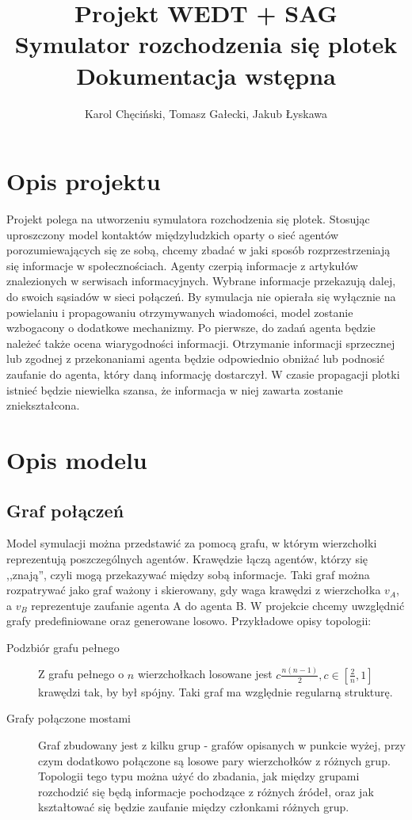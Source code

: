 \documentclass{article}
\title{Projekt WEDT + SAG \\ Symulator rozchodzenia się plotek \\ Dokumentacja wstępna}
\author{Karol Chęciński, Tomasz Gałecki, Jakub Łyskawa}
\begin{document}
	\maketitle
	\section{Opis projektu}
		Projekt polega na utworzeniu symulatora rozchodzenia się plotek. Stosując uproszczony model kontaktów międzyludzkich oparty o sieć agentów porozumiewających się ze sobą, chcemy zbadać w jaki sposób rozprzestrzeniają się informacje w społecznościach. Agenty czerpią informacje z artykułów znalezionych w serwisach informacyjnych. Wybrane informacje przekazują dalej, do swoich sąsiadów w sieci połączeń. 
		By symulacja nie opierała się wyłącznie na powielaniu i propagowaniu otrzymywanych wiadomości, model zostanie wzbogacony o dodatkowe mechanizmy. Po pierwsze, do zadań agenta będzie należeć także ocena wiarygodności informacji. Otrzymanie informacji sprzecznej lub zgodnej z przekonaniami agenta będzie odpowiednio obniżać lub podnosić zaufanie do agenta, który daną informację dostarczył. W czasie propagacji plotki istnieć będzie niewielka szansa, że informacja w niej zawarta zostanie zniekształcona. 
	\section{Opis modelu}
	\subsection{Graf połączeń}
		Model symulacji można przedstawić za pomocą grafu, w którym wierzchołki reprezentują poszczególnych agentów. Krawędzie łączą agentów, którzy się ,,znają'', czyli mogą przekazywać między sobą informacje. Taki graf można rozpatrywać jako graf ważony i skierowany, gdy waga krawędzi z wierzchołka $v_A$, a $v_B$ reprezentuje zaufanie agenta A do agenta B.
		W projekcie chcemy uwzględnić grafy predefiniowane oraz generowane losowo. Przykładowe opisy topologii:
		\begin{description}
		\item[Podzbiór grafu pełnego]
		Z grafu pełnego o $n$ wierzchołkach losowane jest $c\frac{n(n-1)}{2}, c \in [\frac{2}{n}, 1]$ krawędzi tak, by był spójny. Taki graf ma względnie regularną strukturę.
		\item[Grafy połączone mostami]
		Graf zbudowany jest z kilku grup - grafów opisanych w punkcie wyżej, przy czym dodatkowo połączone są losowe pary wierzchołków z różnych grup. Topologii tego typu można użyć do zbadania, jak między grupami rozchodzić się będą informacje pochodzące z różnych źródeł, oraz jak kształtować się będzie zaufanie między członkami różnych grup.
		\end{description}
\end{document}
